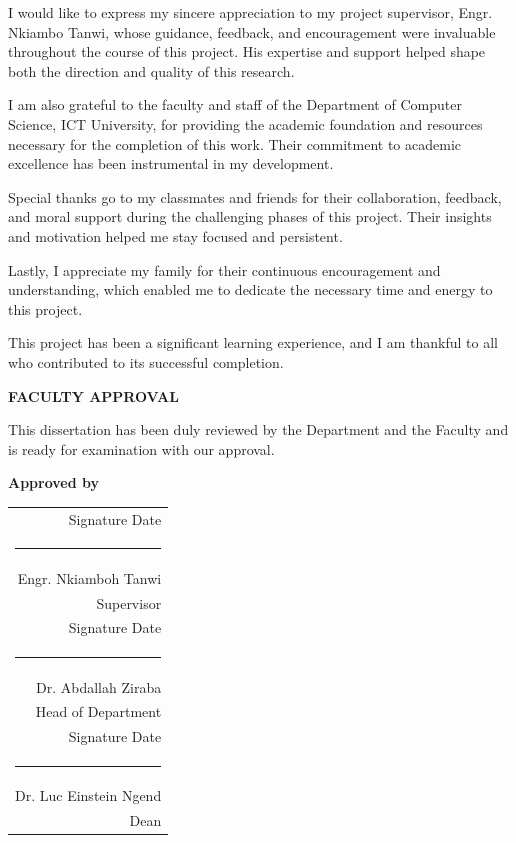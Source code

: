 \documentclass[
  12pt,
  oneside]{article}
\begin{document}
I would like to express my sincere appreciation to my project supervisor, Engr. Nkiambo Tanwi, whose guidance, feedback, and encouragement were invaluable throughout the course of this project. His expertise and support helped shape both the direction and quality of this research.

I am also grateful to the faculty and staff of the Department of Computer Science, ICT University, for providing the academic foundation and resources necessary for the completion of this work. Their commitment to academic excellence has been instrumental in my development.

Special thanks go to my classmates and friends for their collaboration, feedback, and moral support during the challenging phases of this project. Their insights and motivation helped me stay focused and persistent.

Lastly, I appreciate my family for their continuous encouragement and understanding, which enabled me to dedicate the necessary time and energy to this project.

This project has been a significant learning experience, and I am thankful to all who contributed to its successful completion.

\vfill %
\clearpage

\thispagestyle{empty}
\begin{center}
\textbf{\large FACULTY APPROVAL}
\end{center}

\vspace{1cm}

This dissertation has been duly reviewed by the Department and the Faculty and is ready for examination with our approval.

\vspace{2cm}

\begin{flushright}
\textbf{Approved by}

\vspace{1.5cm}

\begin{tabular}{@{}r@{}}
Signature \hspace{3cm} Date \\ [0.5cm]
\rule{6cm}{0.15mm} \\ [0.2cm]
Engr. Nkiamboh Tanwi \\ [0.3cm]
Supervisor \\[1cm]

Signature \hspace{3cm} Date \\ [0.5cm]
\rule{6cm}{0.15mm} \\ [0.2cm]
Dr. Abdallah Ziraba \\ [0.3cm]
Head of Department \\[1cm]

Signature \hspace{3cm} Date \\ [0.5cm]
\rule{6cm}{0.15mm} \\ [0.2cm]
Dr. Luc Einstein Ngend \\ [0.3cm]
Dean \\
\end{tabular}
\end{flushright}
\end{document}
